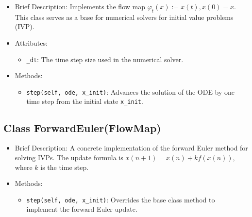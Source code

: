 \begin{itemize}
\item Brief Description: Implements the flow map $\varphi_t(x) := x(t), x(0) = x$. 
  This class serves as a base for numerical solvers for initial value problems (IVP).
\item Attributes:
  \begin{itemize}
  \item \lstinline|_dt|: The time step size used in the numerical solver.
  \end{itemize}
\item Methods:
  \begin{itemize}
  \item \lstinline|step(self, ode, x_init)|: Advances the solution of the ODE by one time step from the initial state \lstinline|x_init|.
  \end{itemize}
\end{itemize}

\subsection{Class ForwardEuler(FlowMap)}

\begin{itemize}
\item Brief Description: A concrete implementation of the forward Euler method
 for solving IVPs.
 The update formula is $x(n+1) = x(n) + kf(x(n))$,
 where $k$ is the time step.
\item Methods:
  \begin{itemize}
  \item \lstinline|step(self, ode, x_init)|:
    Overrides the base class method to implement the forward Euler update.
  \end{itemize}
\end{itemize}



